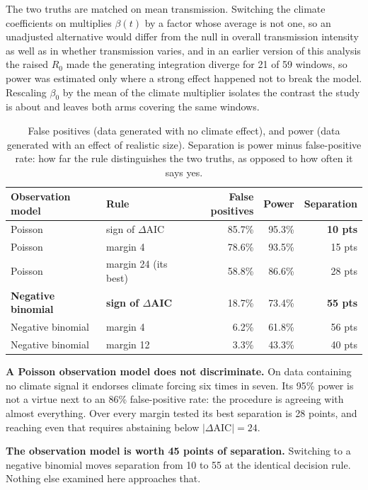 \documentclass[11pt,a4paper]{article}
\begin{document}
The two truths are matched on mean transmission. Switching the climate
coefficients on multiplies $\beta(t)$ by a factor whose average is not one, so an
unadjusted alternative would differ from the null in overall transmission
intensity as well as in whether transmission varies, and in an earlier version
of this analysis the raised $R_0$ made the generating integration diverge for 21
of 59 windows, so power was estimated only where a strong effect happened not to
break the model. Rescaling $\beta_0$ by the mean of the climate multiplier
isolates the contrast the study is about and leaves both arms covering the same
windows.

\begin{table}[htbp]
\centering
\caption{False positives (data generated with no climate effect), and power (data
generated with an effect of realistic size). Separation is power minus
false-positive rate: how far the rule distinguishes the two truths, as opposed to
how often it says yes.}
\begin{tabular}{llrrr}
\toprule
Observation model & Rule & False positives & Power & Separation \\
\midrule
Poisson & sign of $\Delta$AIC & 85.7\% & 95.3\% & \textbf{10 pts} \\
Poisson & margin 4 & 78.6\% & 93.5\% & 15 pts \\
Poisson & margin 24 (its best) & 58.8\% & 86.6\% & 28 pts \\
\midrule
\textbf{Negative binomial} & \textbf{sign of $\Delta$AIC} & 18.7\% & 73.4\% & \textbf{55 pts} \\
Negative binomial & margin 4 & 6.2\% & 61.8\% & 56 pts \\
Negative binomial & margin 12 & 3.3\% & 43.3\% & 40 pts \\
\bottomrule
\end{tabular}
\end{table}

\textbf{A Poisson observation model does not discriminate.} On data containing no
climate signal it endorses climate forcing six times in seven. Its 95\% power is
not a virtue next to an 86\% false-positive rate: the procedure is agreeing with
almost everything. Over every margin tested its best separation is 28 points, and
reaching even that requires abstaining below $|\Delta\mathrm{AIC}| = 24$.

\textbf{The observation model is worth 45 points of separation.} Switching to a
negative binomial moves separation from 10 to 55 at the identical decision rule.
Nothing else examined here approaches that.
\end{document}
